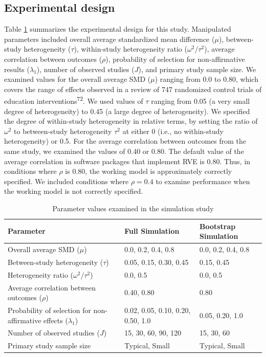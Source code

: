 \documentclass[
  american,
  man, donotrepeattitle,floatsintext]{apa7}
\begin{document}
\subsection{Experimental design}\label{experimental-design}

Table \ref{tab:sim-design} summarizes the experimental design for this study.
Manipulated parameters included overall average standardized mean difference
(\(\mu\)), between-study heterogeneity (\(\tau\)), within-study heterogeneity ratio
(\(\omega^2 / \tau^2\)), average correlation between outcomes (\(\rho\)),
probability of selection for non-affirmative results (\(\lambda_1\)), number of observed studies (\(J\)), and primary study sample size.
We examined values for the overall average SMD (\(\mu\)) ranging from 0.0 to 0.80, which covers the range of effects observed in a review of 747 randomized control trials of education interventions\textsuperscript{72}.
We used values of \(\tau\) ranging from 0.05 (a very small degree of heterogeneity) to 0.45 (a large degree of heterogeneity).
We specified the degree of within-study heterogeneity in relative terms, by setting the ratio of \(\omega^2\) to between-study heterogeneity \(\tau^2\) at either 0 (i.e., no within-study heterogeneity) or 0.5.
For the average correlation between outcomes from the same study, we examined the values of 0.40 or 0.80. The default value of the average
correlation in software packages that implement RVE is 0.80.
Thus, in conditions where \(\rho\) is 0.80, the working model is approximately correctly specified.
We included conditions where \(\rho = 0.4\) to examine performance when the working model is not correctly specified.

\begin{table}[tb]
\centering
\caption{\label{tab:sim-design}Parameter values examined in the simulation study}
\centering
\begin{tabular}[t]{>{\raggedright\arraybackslash}p{2.5in}ll}
\toprule
Parameter & Full Simulation & Bootstrap Simulation\\
\midrule
Overall average SMD ($\mu$) & 0.0, 0.2, 0.4, 0.8 & 0.0, 0.2, 0.4, 0.8\\
Between-study heterogeneity ($\tau$) & 0.05, 0.15, 0.30, 0.45 & 0.15, 0.45\\
Heterogeneity ratio ($\omega^2 / \tau^2$) & 0.0, 0.5 & 0.0, 0.5\\
Average correlation between outcomes ($\rho$) & 0.40, 0.80 & 0.80\\
Probability of selection for non-affirmative effects ($\lambda_1$) & 0.02, 0.05, 0.10, 0.20, 0.50, 1.0 & 0.05, 0.20, 1.0\\
\addlinespace
Number of observed studies ($J$) & 15, 30, 60, 90, 120 & 15, 30, 60\\
Primary study sample size & Typical, Small & Typical, Small\\
\bottomrule
\end{tabular}
\end{table}
\end{document}
